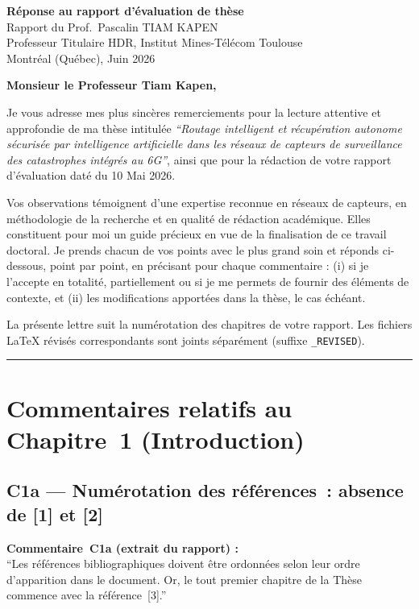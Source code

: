 \documentclass[12pt,a4paper]{article}
\newcommand{\Commentaire}[2]{%
  \begin{reviewerbox}
    \textbf{Commentaire~#1 (extrait du rapport) :}\\#2
  \end{reviewerbox}%
}
\begin{document}
\begin{center}
  {\LARGE\bfseries Réponse au rapport d'évaluation de thèse}\\[6pt]
  {\large Rapport du Prof.\ Pascalin TIAM KAPEN\\
  Professeur Titulaire HDR, Institut Mines-Télécom Toulouse}\\[4pt]
  {\normalsize Montréal (Québec), Juin 2026}
\end{center}

\bigskip
\noindent
\textbf{Monsieur le Professeur Tiam Kapen,}

\medskip
Je vous adresse mes plus sincères remerciements pour la lecture attentive et approfondie de ma thèse intitulée \emph{``Routage intelligent et récupération autonome sécurisée par intelligence artificielle dans les réseaux de capteurs de surveillance des catastrophes intégrés au 6G''}, ainsi que pour la rédaction de votre rapport d'évaluation daté du 10 Mai 2026.

Vos observations témoignent d'une expertise reconnue en réseaux de capteurs, en méthodologie de la recherche et en qualité de rédaction académique. Elles constituent pour moi un guide précieux en vue de la finalisation de ce travail doctoral. Je prends chacun de vos points avec le plus grand soin et réponds ci-dessous, point par point, en précisant pour chaque commentaire : (i) si je l'accepte en totalité, partiellement ou si je me permets de fournir des éléments de contexte, et (ii) les modifications apportées dans la thèse, le cas échéant.

La présente lettre suit la numérotation des chapitres de votre rapport. Les fichiers \LaTeX{} révisés correspondants sont joints séparément (suffixe \texttt{\_REVISED}).

\bigskip
\hrule
\bigskip

\section*{Commentaires relatifs au Chapitre~1 (Introduction)}

\subsection*{C1a --- Numérotation des références~: absence de [1] et [2]}

\Commentaire{C1a}{
  ``Les références bibliographiques doivent être ordonnées selon leur ordre d'apparition dans le
  document. Or, le tout premier chapitre de la Thèse commence avec la référence~[3].''
}
\end{document}
